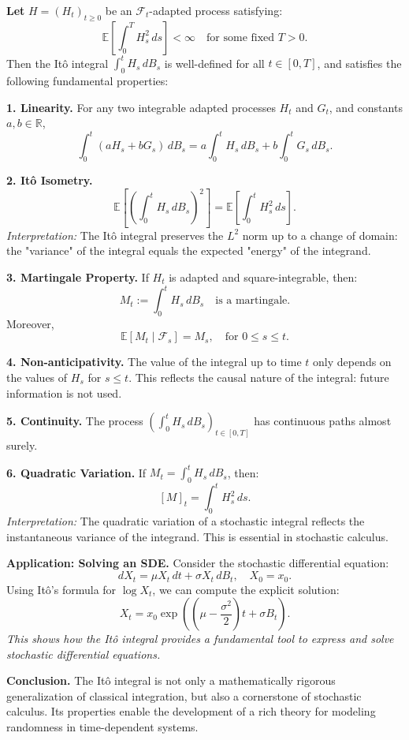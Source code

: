 

\textbf{Let} \( H = (H_t)_{t \geq 0} \) be an \( \mathcal{F}_t \)-adapted process satisfying:
\[
\mathbb{E} \left[ \int_0^T H_s^2 \, ds \right] < \infty
\quad \text{for some fixed } T > 0.
\]
Then the Itô integral \( \int_0^t H_s \, dB_s \) is well-defined for all \( t \in [0,T] \), and satisfies the following fundamental properties:

\vspace{1em}
\textbf{1. Linearity.}  
For any two integrable adapted processes \( H_t \) and \( G_t \), and constants \( a, b \in \mathbb{R} \),
\[
\int_0^t (aH_s + bG_s) \, dB_s = a \int_0^t H_s \, dB_s + b \int_0^t G_s \, dB_s.
\]

\vspace{1em}
\textbf{2. Itô Isometry.}  
\[
\mathbb{E} \left[ \left( \int_0^t H_s \, dB_s \right)^2 \right] = \mathbb{E} \left[ \int_0^t H_s^2 \, ds \right].
\]
\textit{Interpretation:} The Itô integral preserves the \( L^2 \) norm up to a change of domain: the "variance" of the integral equals the expected "energy" of the integrand.

\vspace{1em}
\textbf{3. Martingale Property.}  
If \( H_t \) is adapted and square-integrable, then:
\[
M_t := \int_0^t H_s \, dB_s
\quad \text{is a martingale}.
\]
Moreover,
\[
\mathbb{E}[M_t \mid \mathcal{F}_s] = M_s, \quad \text{for } 0 \leq s \leq t.
\]

\vspace{1em}
\textbf{4. Non-anticipativity.}  
The value of the integral up to time \( t \) only depends on the values of \( H_s \) for \( s \leq t \). This reflects the causal nature of the integral: future information is not used.

\vspace{1em}
\textbf{5. Continuity.}  
The process \( \left( \int_0^t H_s \, dB_s \right)_{t \in [0,T]} \) has continuous paths almost surely.

\vspace{1em}
\textbf{6. Quadratic Variation.}  
If \( M_t = \int_0^t H_s \, dB_s \), then:
\[
[M]_t = \int_0^t H_s^2 \, ds.
\]
\textit{Interpretation:} The quadratic variation of a stochastic integral reflects the instantaneous variance of the integrand. This is essential in stochastic calculus.

\vspace{1em}
\textbf{Application: Solving an SDE.}  
Consider the stochastic differential equation:
\[
dX_t = \mu X_t \, dt + \sigma X_t \, dB_t, \quad X_0 = x_0.
\]
Using Itô's formula for \( \log X_t \), we can compute the explicit solution:
\[
X_t = x_0 \exp\left( \left( \mu - \frac{\sigma^2}{2} \right)t + \sigma B_t \right).
\]
\textit{This shows how the Itô integral provides a fundamental tool to express and solve stochastic differential equations.}

\vspace{1em}
\textbf{Conclusion.}  
The Itô integral is not only a mathematically rigorous generalization of classical integration, but also a cornerstone of stochastic calculus. Its properties enable the development of a rich theory for modeling randomness in time-dependent systems.